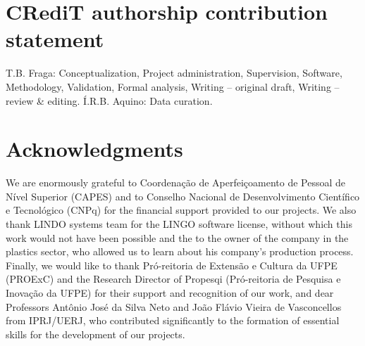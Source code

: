 \documentclass[authoryear,preprint,12pt]{elsarticle}
\begin{document}
\section{CRediT authorship contribution statement} 
\label{sec:contributions}

T.B. Fraga: Conceptualization, Project administration, Supervision, Software, Methodology, Validation, Formal analysis, Writing – original draft, Writing – review \& editing. Í.R.B. Aquino: Data curation.

\section{Acknowledgments}
\label{sec:acknowledgments}

We are enormously grateful to Coordenação de Aperfeiçoamento de Pessoal de Nível Superior (CAPES) and to Conselho Nacional de Desenvolvimento Científico e Tecnológico (CNPq) for the financial support provided to our projects. We also thank LINDO systems team for the LINGO software license, without which this work would not have been possible and the to the owner of the company in the plastics sector, who allowed us to learn about his company's production process. Finally, we would like to thank Pró-reitoria de Extensão e Cultura da UFPE (PROExC) and the Research Director of Propesqi (Pró-reitoria de Pesquisa e Inovação da UFPE) for their support and recognition of our work, and dear Professors Antônio José da Silva Neto and João Flávio Vieira de Vasconcellos from IPRJ/UERJ, who contributed significantly to the formation of essential skills for the development of our projects.




\end{document}
